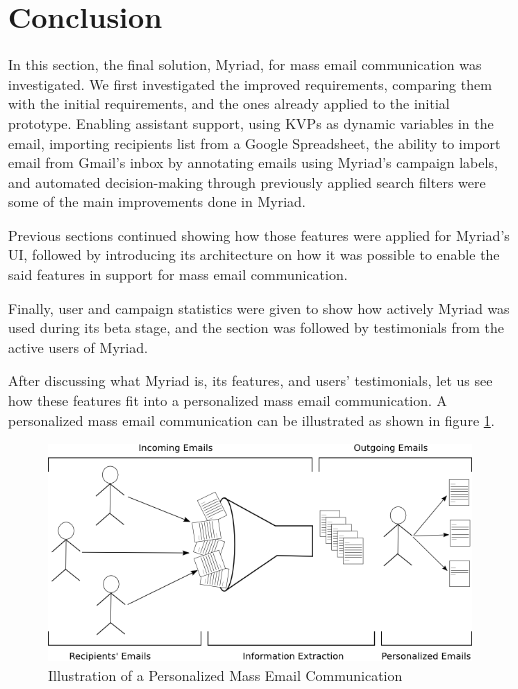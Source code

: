 \section{Conclusion}
\label{sec:5.5:Conc}

In this section, the final solution, Myriad, for mass email communication was investigated. We first investigated the improved requirements, comparing them with the initial requirements, and the ones already applied to the initial prototype. Enabling assistant support, using \ac{KVP}s as dynamic variables in the email, importing recipients list from a Google Spreadsheet, the ability to import email from Gmail's inbox by annotating emails using Myriad's campaign labels, and automated decision-making through previously applied search filters were some of the main improvements done in Myriad.
\vspace{1cm}

Previous sections continued showing how those features were applied for Myriad's \ac{UI}, followed by introducing its architecture on how it was possible to enable the said features in support for mass email communication.
\vspace{1cm}

Finally, user and campaign statistics were given to show how actively Myriad was used during its beta stage, and the section was followed by testimonials from the active users of Myriad.
\vspace{1cm}

After discussing what Myriad is, its features, and users' testimonials, let us see how these features fit into a personalized mass email communication. A personalized mass email communication can be illustrated as shown in figure \ref{fig:drawingStatesOfEmailCommunication}.

\begin{figure}[htbp]
	\centering
	\includegraphics[width=1.00\textwidth]{imgs/drawingStatesOfEmailCommunication.png}
	\caption[Illustration of a Personalized Mass Email Communication]{Illustration of a Personalized Mass Email Communication}
	\label{fig:drawingStatesOfEmailCommunication}
\end{figure}


